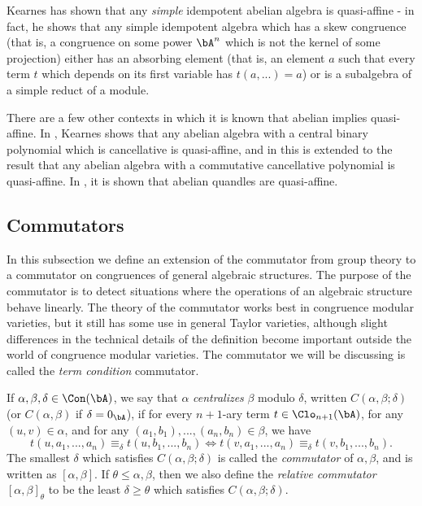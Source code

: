 Kearnes \cite{kearnes-simple} has shown that any \emph{simple} idempotent abelian algebra is quasi-affine - in fact, he shows that any simple idempotent algebra which has a skew congruence (that is, a congruence on some power $\bA^n$ which is not the kernel of some projection) either has an absorbing element (that is, an element $a$ such that every term $t$ which depends on its first variable has $t(a,...) = a$) or is a subalgebra of a simple reduct of a module.

There are a few other contexts in which it is known that abelian implies quasi-affine. In \cite{kearnes-quasi-affine}, Kearnes shows that any abelian algebra with a central binary polynomial which is cancellative is quasi-affine, and in \cite{stronkowski-embedding} this is extended to the result that any abelian algebra with a commutative cancellative polynomial is quasi-affine. In \cite{affine-quandles}, it is shown that abelian quandles are quasi-affine.


\subsection{Commutators}

In this subsection we define an extension of the commutator from group theory to a commutator on congruences of general algebraic structures. The purpose of the commutator is to detect situations where the operations of an algebraic structure behave linearly. The theory of the commutator works best in congruence modular varieties, but it still has some use in general Taylor varieties, although slight differences in the technical details of the definition become important outside the world of congruence modular varieties. The commutator we will be discussing is called the \emph{term condition} commutator.

\begin{defn} If $\alpha, \beta, \delta \in \Con(\bA)$, we say that $\alpha$ \emph{centralizes} $\beta$ modulo $\delta$, written $C(\alpha,\beta;\delta)$ (or $C(\alpha,\beta)$ if $\delta = 0_\bA$), if for every $n+1$-ary term $t \in \Clo_{n+1}(\bA)$, for any $(u,v) \in \alpha$, and for any $(a_1,b_1), ..., (a_n,b_n) \in \beta$, we have
\[
t(u,a_1, ..., a_n) \equiv_\delta t(u,b_1, ..., b_n) \iff t(v,a_1,...,a_n) \equiv_\delta t(v,b_1,...,b_n).
\]
The smallest $\delta$ which satisfies $C(\alpha,\beta;\delta)$ is called the \emph{commutator} of $\alpha,\beta$, and is written as $[\alpha,\beta]$. If $\theta \le \alpha,\beta$, then we also define the \emph{relative commutator} $[\alpha,\beta]_\theta$ to be the least $\delta \ge \theta$ which satisfies $C(\alpha,\beta;\delta)$.
\end{defn}

